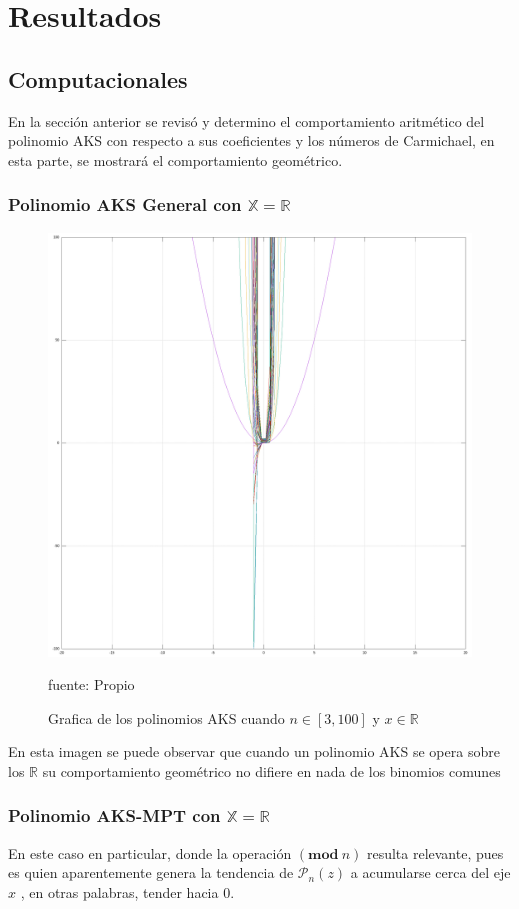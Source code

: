 \documentclass[a4paper, 12pt]{article}
\begin{document}
\section{Resultados}
\subsection{Computacionales}
En la sección anterior se revisó y determino el comportamiento aritmético del polinomio AKS con respecto a sus coeficientes y los números de Carmichael, en esta parte, se mostrará el comportamiento geométrico.
\subsubsection{Polinomio AKS General con $\mathbb{X} = \mathbb{R}$}
\begin{figure}[h!]
	\centering
	\includegraphics[width=0.9\linewidth, height=0.7\linewidth]{nonAKSp}
	\caption[Polinomios AKS $(x + 1)^n$]{Grafica de los polinomios AKS cuando $n \in [3,100]$ y $x \in \mathbb{R}$}
	\small{fuente: Propio}
	\label{fig:nonaksp}
\end{figure}

En esta imagen se puede observar que cuando un polinomio AKS se opera sobre los $\mathbb{R}$ su comportamiento geométrico no difiere en nada de los binomios comunes \cite{}

\pagebreak

\subsubsection{Polinomio AKS-MPT con $\mathbb{X} = \mathbb{R}$}
En este caso en particular, donde la operación $ (\mathbf{mod}\ n) $ resulta relevante, pues es quien aparentemente genera la tendencia de $\mathcal{P}_{n}(z)$  a acumularse cerca del eje $x$ , en otras palabras, tender hacia $0$.
\end{document}
